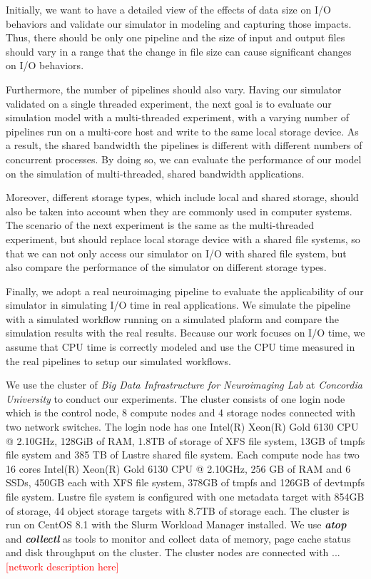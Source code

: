 \documentclass[conference]{IEEEtran}
\begin{document}
			Initially, we want to have a detailed view of the effects of data size 
			on I/O behaviors and validate our simulator in modeling and 
			capturing those impacts. Thus, there should be only one pipeline and 
			the size of input and output files should vary in a range that 
			the change in file size can cause significant changes on I/O behaviors. 
			
			Furthermore, the number of pipelines should also vary. Having our 
			simulator validated on a single threaded experiment, the next goal 
		    is to evaluate our simulation model with a multi-threaded experiment, 
		    with a varying number of pipelines run on a multi-core host and write 
		    to the same local storage device. As a result, the shared bandwidth 
		    the pipelines is different with different numbers of concurrent processes. 
		    By doing so, we can evaluate the performance of our model on the simulation 
		    of multi-threaded, shared bandwidth applications.
		    
		    Moreover, different storage types, which include local and shared 
		    storage, should also be taken into account when they are commonly used 
		    in computer systems. The scenario of the next experiment is the same as 
		    the multi-threaded experiment, but should replace local storage device 
		    with a shared file systems, so that we can not only access our 
		    simulator on I/O with shared file system, but also compare the 
		    performance of the simulator on different storage types. 
		    
		    Finally, we adopt a real neuroimaging pipeline to evaluate the 
		    applicability of our simulator in simulating I/O time in real
			applications. We simulate the pipeline with a simulated workflow running 
			on a simulated plaform and compare the simulation results with the real 
			results. Because our work focuses on I/O time, we assume
			that CPU time is correctly modeled and use the CPU time measured 
			in the real pipelines to setup our simulated workflows. 
			
			We use the cluster of \textit{Big Data Infrastructure for Neuroimaging Lab} 
			at \textit{Concordia University} to conduct our experiments. The cluster 
			consists of one login node which is the control node, 8 compute nodes 
			and 4 storage nodes connected with two network switches. The login node 
			has one Intel(R) Xeon(R) Gold 6130 CPU @ 2.10GHz, 128GiB of RAM, 1.8TB 
			of storage of XFS file system, 13GB of tmpfs file system and 385 TB of 
			Lustre shared file system. Each compute node has two 16 cores Intel(R) 
			Xeon(R) Gold 6130 CPU @ 2.10GHz, 256 GB of RAM and 6 SSDs, 450GB each 
			with XFS file system, 378GB of tmpfs and 126GB of devtmpfs file system.
			Lustre file system is configured with one metadata target with 854GB 
			of storage, 44 object storage targets with 8.7TB of storage each. 
			The cluster is run on CentOS 8.1 with the Slurm Workload Manager installed. We use 
			\textbf{\textit{atop}} and \textbf{\textit{collectl}} as tools to monitor 
			and collect data of memory, page cache status and disk throughput on 
			the cluster. The cluster nodes are connected with ... 
			\textcolor{red}{[network description here]}
	
\end{document}
